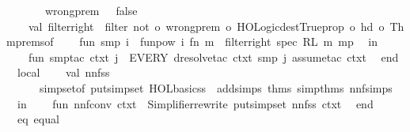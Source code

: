 \begin{isabellebody}
\ \ \ \ \ \ {\isacharbar}{\kern0pt}\ wrong{\isacharunderscore}{\kern0pt}prem\ {\isacharunderscore}{\kern0pt}\ {\isacharequal}{\kern0pt}\ false{\isacharsemicolon}{\kern0pt}\isanewline
\ \ \ \ val\ filter{\isacharunderscore}{\kern0pt}right\ {\isacharequal}{\kern0pt}\ filter\ {\isacharparenleft}{\kern0pt}not\ o\ wrong{\isacharunderscore}{\kern0pt}prem\ o\ HOLogic{\isachardot}{\kern0pt}dest{\isacharunderscore}{\kern0pt}Trueprop\ o\ hd\ o\ Thm{\isachardot}{\kern0pt}prems{\isacharunderscore}{\kern0pt}of{\isacharparenright}{\kern0pt}{\isacharsemicolon}{\kern0pt}\isanewline
\ \ \ \ fun\ smp\ i\ {\isacharequal}{\kern0pt}\ funpow\ i\ {\isacharparenleft}{\kern0pt}fn\ m\ {\isacharequal}{\kern0pt}{\isachargreater}{\kern0pt}\ filter{\isacharunderscore}{\kern0pt}right\ {\isacharparenleft}{\kern0pt}{\isacharbrackleft}{\kern0pt}spec{\isacharbrackright}{\kern0pt}\ RL\ m{\isacharparenright}{\kern0pt}{\isacharparenright}{\kern0pt}\ {\isacharbrackleft}{\kern0pt}mp{\isacharbrackright}{\kern0pt}{\isacharsemicolon}{\kern0pt}\isanewline
\ \ in\isanewline
\ \ \ \ fun\ smp{\isacharunderscore}{\kern0pt}tac\ ctxt\ j\ {\isacharequal}{\kern0pt}\ EVERY{\isacharprime}{\kern0pt}\ {\isacharbrackleft}{\kern0pt}dresolve{\isacharunderscore}{\kern0pt}tac\ ctxt\ {\isacharparenleft}{\kern0pt}smp\ j{\isacharparenright}{\kern0pt}{\isacharcomma}{\kern0pt}\ assume{\isacharunderscore}{\kern0pt}tac\ ctxt{\isacharbrackright}{\kern0pt}{\isacharsemicolon}{\kern0pt}\isanewline
\ \ end{\isacharsemicolon}{\kern0pt}\isanewline
\isanewline
\ \ local\isanewline
\ \ \ \ val\ nnf{\isacharunderscore}{\kern0pt}ss\ {\isacharequal}{\kern0pt}\isanewline
\ \ \ \ \ \ simpset{\isacharunderscore}{\kern0pt}of\ {\isacharparenleft}{\kern0pt}put{\isacharunderscore}{\kern0pt}simpset\ HOL{\isacharunderscore}{\kern0pt}basic{\isacharunderscore}{\kern0pt}ss\ \isactrlcontext \ addsimps\ {\isacharat}{\kern0pt}{\isacharbraceleft}{\kern0pt}thms\ simp{\isacharunderscore}{\kern0pt}thms\ nnf{\isacharunderscore}{\kern0pt}simps{\isacharbraceright}{\kern0pt}{\isacharparenright}{\kern0pt}{\isacharsemicolon}{\kern0pt}\isanewline
\ \ in\isanewline
\ \ \ \ fun\ nnf{\isacharunderscore}{\kern0pt}conv\ ctxt\ {\isacharequal}{\kern0pt}\ Simplifier{\isachardot}{\kern0pt}rewrite\ {\isacharparenleft}{\kern0pt}put{\isacharunderscore}{\kern0pt}simpset\ nnf{\isacharunderscore}{\kern0pt}ss\ ctxt{\isacharparenright}{\kern0pt}{\isacharsemicolon}{\kern0pt}\isanewline
\ \ end\isanewline
{\isacartoucheclose}%
\endisatagML
{\isafoldML}%
%
\isadelimML
%
\endisadelimML
\isanewline
\isanewline
{}\isamarkupfalse%
\ {\isacharparenleft}{\kern0pt}\ eq\ equal\isanewline
%
\isadelimtheory
\isanewline
%
\endisadelimtheory
%
\isatagtheory
{}\isamarkupfalse%
%
\endisatagtheory
{\isafoldtheory}%
%
\isadelimtheory
%
\endisadelimtheory
%
\end{isabellebody}%
